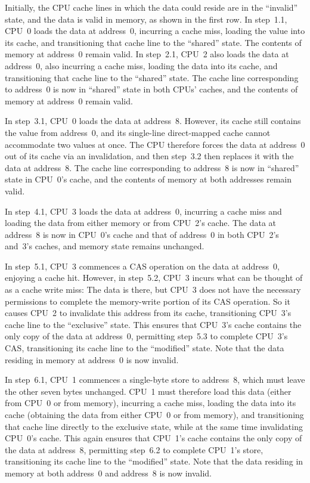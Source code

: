 Initially, the CPU cache lines in which the data could reside are
in the ``invalid'' state, and the data is valid in memory, as shown
in the first row.
In step~1.1, CPU~0 loads the data at address~0, incurring a cache miss,
loading the value into its cache, and transitioning that cache line to
the ``shared'' state.
The contents of memory at address~0 remain valid.
In step~2.1, CPU~2 also loads the data at address~0, also incurring a
cache miss, loading the data into its cache, and transitioning that cache
line to the ``shared'' state.
The cache line corresponding to address~0 is now in ``shared'' state in
both CPUs' caches, and the contents of memory at address~0 remain valid.

In step~3.1, CPU~0 loads the data at address~8.
However, its cache still contains the value from address~0, and its
single-line direct-mapped cache cannot accommodate two values at once.
The CPU therefore forces the data at address~0 out of its cache via
an invalidation, and then step~3.2 then replaces it with the data at
address~8.
The cache line corresponding to address~8 is now in ``shared'' state in
CPU~0's cache, and the contents of memory at both addresses remain valid.

In step~4.1, CPU~3 loads the data at address~0, incurring a cache miss
and loading the data from either memory or from CPU~2's cache.
The data at address~8 is now in CPU~0's cache and that of address~0 in
both CPU~2's and~3's caches, and memory state remains unchanged.

In step~5.1, CPU~3 commences a CAS operation on the data at
address~0, enjoying a cache hit.
However, in step~5.2, CPU~3 incurs what can be thought of as a cache
write miss:
The data is there, but CPU~3 does not have the necessary permissions
to complete the memory-write portion of its CAS operation.
So it causes CPU~2 to invalidate this address from its cache, transitioning
CPU~3's cache line to the ``exclusive'' state.
This ensures that CPU~3's cache contains the only copy of the data at
address~0, permitting step~5.3 to complete CPU~3's CAS, transitioning
its cache line to the ``modified'' state.
Note that the data residing in memory at address~0 is now invalid.

In step~6.1, CPU~1 commences a single-byte store to address~8, which
must leave the other seven bytes unchanged.
CPU~1 must therefore load this data (either from CPU~0 or from memory),
incurring a cache miss, loading the data into its cache (obtaining the
data from either CPU~0 or from memory), and transitioning that cache
line directly to the exclusive state, while at the same time invalidating
CPU~0's cache.
This again ensures that CPU~1's cache contains the only copy of the
data at address~8, permitting step~6.2 to complete CPU~1's store,
transitioning its cache line to the ``modified'' state.
Note that the data residing in memory at both address~0 and address~8
is now invalid.

